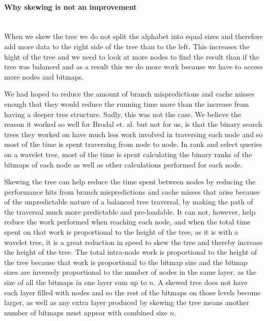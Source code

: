 \paragraph{Why skewing is not an improvement}~\\
When we skew the tree we do not split the alphabet into equal sizes and therefore add more data to the right side of the tree than to the left. 
This increases the hight of the tree and we need to look at more nodes to find the result than if the tree was balanced and as a result this we do more work because we have to access more nodes and bitmaps.

We had hoped to reduce the amount of branch mispredictions and cache misses enough that they would reduce the running time more than the increase from having a deeper tree structure.
Sadly, this was not the case. We believe the reason it worked so well for Brodal et. al.\cite{gerthSkewedBinarySearchTrees} but not for us, is that the binary search trees they worked on have much less work involved in traversing each node and so most of the time is spent traversing from node to node.
In rank and select queries on a wavelet tree, most of the time is spent calculating the binary ranks of the bitmaps of each node as well as other calculations performed for each node.

Skewing the tree can help reduce the time spent between nodes by reducing the performance hits from branch mispredictions and cache misses that arise because of the unpredictable nature of a balanced tree traversal, by making the path of the traversal much more predictable and pre-loadable.
It can not, however, help reduce the work performed when reaching each node, and when the total time spent on that work is proportional to the height of the tree, as it is with a wavelet tree, it is a great reduction in speed to skew the tree and thereby increase the height of the tree.
The total intra-node work is proportional to the height of the tree because that work is proportional to the bitmap size and the bitmap sizes are inversely proportional to the number of nodes in the same layer, as the size of all the bitmaps in one layer sum up to $n$. A skewed tree does not have each layer filled with nodes and so the rest of the bitmaps on those levels become larger, as well as any extra layer produced by skewing the tree means another number of bitmaps must appear with combined size $n$.


